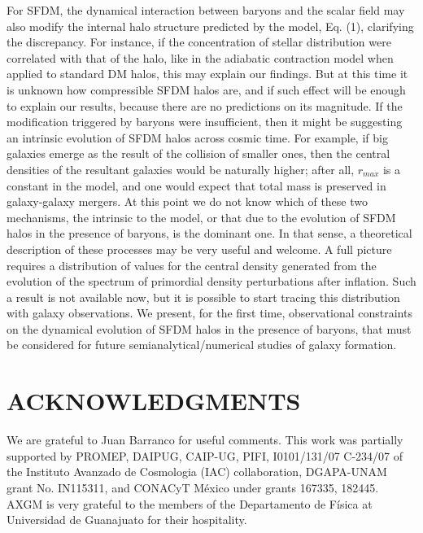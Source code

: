 \documentclass[%
 twocolumn,
 amsmath,amssymb,
 aps,
]{revtex4-2}
\begin{document}
For SFDM, the dynamical interaction between baryons
and the scalar field may also modify the internal halo
structure predicted by the model, Eq. (1), clarifying the
discrepancy. For instance, if the concentration of stellar distribution were correlated with that of the halo,
like in the adiabatic contraction model when applied to
standard DM halos, this may explain our findings. But at this time it is unknown how compressible SFDM halos are, and if such effect will be enough to explain our
results, because there are no predictions on its magnitude. If the modification triggered by baryons were insufficient, then it might be suggesting an intrinsic evolution
of SFDM halos across cosmic time. For example, if big
galaxies emerge as the result of the collision of smaller
ones, then the central densities of the resultant galaxies
would be naturally higher; after all, $r_{max}$ is a constant
in the model, and one would expect that total mass is
preserved in galaxy-galaxy mergers. At this point we do
not know which of these two mechanisms, the intrinsic to
the model, or that due to the evolution of SFDM halos
in the presence of baryons, is the dominant one. In that
sense, a theoretical description of these processes may be
very useful and welcome.
A full picture requires a distribution of values for the
central density generated from the evolution of the spectrum of primordial density perturbations after inflation.
Such a result is not available now, but it is possible to
start tracing this distribution with galaxy observations.
We present, for the first time, observational constraints
on the dynamical evolution of SFDM halos in the presence of baryons, that must be considered for future semianalytical/numerical studies of galaxy formation.


\section*{ACKNOWLEDGMENTS}
We are grateful to Juan Barranco for useful comments.
This work was partially supported by PROMEP, DAIPUG, CAIP-UG, PIFI, I0101/131/07 C-234/07 of the Instituto Avanzado de Cosmologia (IAC) collaboration,
DGAPA-UNAM grant No. IN115311, and CONACyT
México under grants 167335, 182445. AXGM is very
grateful to the members of the Departamento de Física
at Universidad de Guanajuato for their hospitality.
\end{document}
